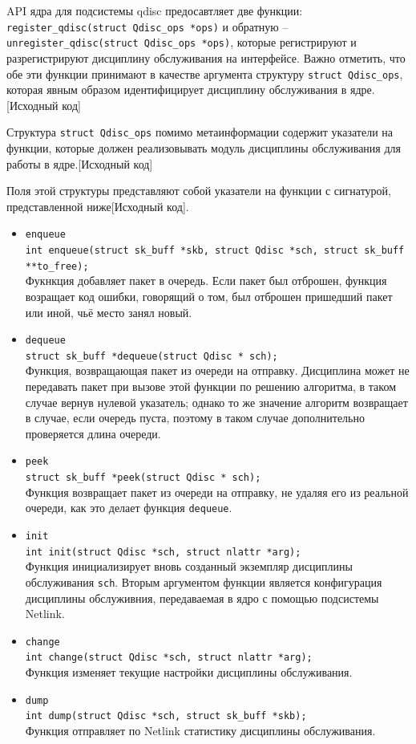 	API ядра для подсистемы qdisc предосавтляет две функции: \lstinline{register_qdisc(struct Qdisc_ops *ops)}
	и обратную -- \lstinline{unregister_qdisc(struct Qdisc_ops *ops)}, которые регистрируют
	и разрегистрируют дисциплину обслуживания на интерфейсе. Важно отметить, что обе эти
	функции принимают в качестве аргумента структуру \lstinline{struct Qdisc_ops},
	которая явным образом идентифицирует дисциплину обслуживания в ядре.[Исходный код]

	Структура \lstinline{struct Qdisc_ops} помимо метаинформации содержит указатели на функции,
	которые должен реализовывать модуль дисциплины обслуживания для работы в ядре.[Исходный код]

	Поля этой структуры представляют собой указатели на функции с сигнатурой,
	представленной ниже[Исходный код].
	\begin{itemize}
		\item \lstinline{enqueue}\\
   		    \lstinline{int enqueue(struct sk_buff *skb, struct Qdisc *sch, struct sk_buff **to_free);} \\
			Фукнкция добавляет пакет в очередь. Если пакет был отброшен, функция
			возращает код ошибки, говорящий о том, был отброшен пришедший пакет или
			иной, чьё место занял новый.
		\item \lstinline{dequeue}\\
			\lstinline{struct sk_buff *dequeue(struct Qdisc * sch);} \\
			Функция, возвращающая пакет из очереди на отправку. Дисциплина
			может не передавать пакет при вызове этой функции по решению
			алгоритма, в таком случае вернув нулевой указатель; 
			однако то же значение алгоритм возвращает в случае, если очередь
			пуста, поэтому в таком случае дополнительно проверяется длина
			очереди.
		\item \lstinline{peek}\\
			\lstinline{struct sk_buff *peek(struct Qdisc * sch);}\\
			Функция возвращает пакет из очереди на отправку, не удаляя его из реальной очереди,
			как это делает функция \lstinline{dequeue}.
		\item \lstinline{init}\\
			  \lstinline{int init(struct Qdisc *sch, struct nlattr *arg);}\\
			  Функция инициализирует вновь созданный экземпляр дисциплины обслуживания \texttt{sch}.
			  Вторым аргументом функции является конфигурация дисциплины обслуживния, передаваемая
			  в ядро с помощью подсистемы Netlink.
		\item \lstinline{change}\\
			  \lstinline{int change(struct Qdisc *sch, struct nlattr *arg);}\\
			  Функция изменяет текущие настройки дисциплины обслуживания. 
		\item \lstinline{dump}\\
			  \lstinline{int dump(struct Qdisc *sch, struct sk_buff *skb);}\\
			  Функция отправляет по Netlink статистику дисциплины обслуживания.
	\end{itemize}

